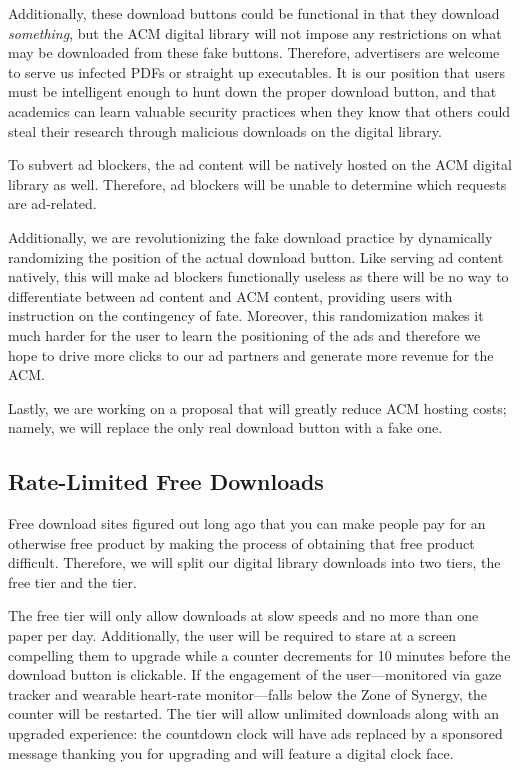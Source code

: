 Additionally, these download buttons could be functional in that they download
\textit{something}, but the ACM digital library will not impose any
restrictions on what may be downloaded from these fake buttons.
Therefore, advertisers are welcome to serve us infected PDFs or straight up
executables.
It is our position that users must be intelligent enough to hunt down the
proper download button, and that academics can learn valuable security
practices when they know that others could steal their research through
malicious downloads on the digital library.

To subvert ad blockers, the ad content will be natively hosted on the ACM
digital library as well.
Therefore, ad blockers will be unable to determine which requests are ad-related.

Additionally, we are revolutionizing the fake download practice by dynamically
randomizing the position of the actual download button.
Like serving ad content natively, this will make ad blockers functionally
useless as there will be no way to differentiate between ad content and ACM
content, providing users with instruction on the contingency of fate.
Moreover, this randomization makes it much harder for the user to learn the
positioning of the ads and therefore we hope to drive more clicks to our ad
partners and generate more revenue for the ACM.

Lastly, we are working on a proposal that will greatly reduce ACM hosting
costs; namely, we  will replace the only real download button with a fake one.

\subsection{Rate-Limited Free Downloads}
\label{sec:limit}
Free download sites figured out long ago that you can make people pay for an
otherwise free product by making the process of obtaining that free product
difficult.
Therefore, we will split our digital library downloads into two tiers, the free
tier and the \premium tier.

The free tier will only allow downloads at slow speeds and no more than one
paper per day.
Additionally, the user will be required to stare at a screen compelling them to
upgrade while a counter decrements for 10 minutes before the download button is
clickable.
If the engagement of the user---monitored via gaze tracker and wearable
heart-rate monitor---falls below the Zone of Synergy\texttrademark, the counter will be restarted.
The \premium tier will allow unlimited downloads along with an upgraded
experience: the countdown clock will have ads replaced by a sponsored message
thanking you for upgrading and will feature a \premium digital clock face.

